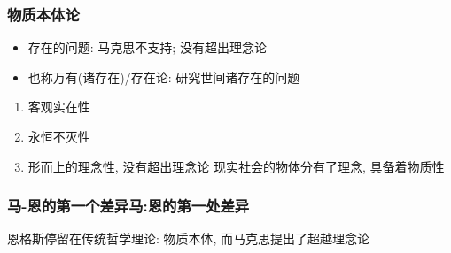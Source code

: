 \documentclass[11pt]{article}
\begin{document}
\subsubsection{物质本体论}
\label{sec:orgded702c}
\begin{itemize}
\item 存在的问题: 马克思不支持; 没有超出理念论
\item 也称万有(诸存在)/存在论: 研究世间诸存在的问题
\end{itemize}
\begin{enumerate}
\item 客观实在性
\label{sec:org6c6a8a2}
\item 永恒不灭性
\label{sec:orgc3e1f98}
\item 形而上的理念性, 没有超出理念论
\label{sec:org1892014}
现实社会的物体分有了理念, 具备着物质性
\end{enumerate}
\subsubsection{马-恩的第一个差异\hfill{}\textsc{马:恩的第一处差异}}
\label{sec:org88eda18}
恩格斯停留在传统哲学理论: 物质本体, 而马克思提出了超越理念论
\end{document}
